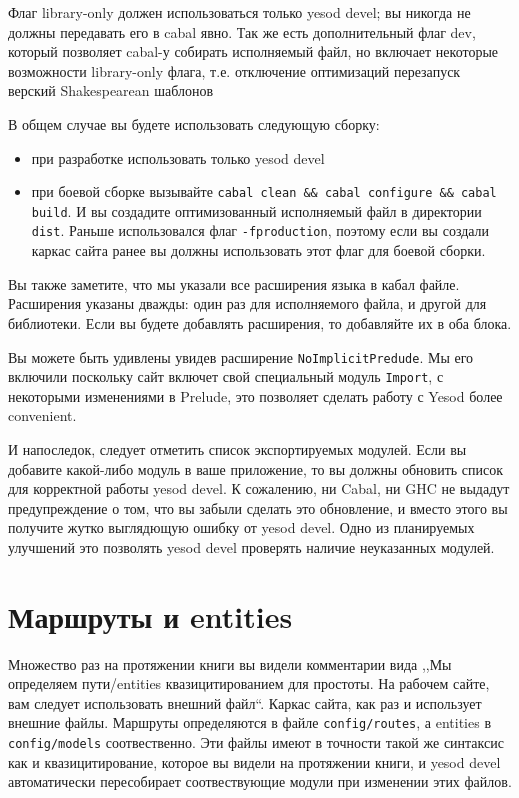 Флаг library-only должен использоваться только yesod devel; вы никогда не должны передавать его в 
cabal явно. Так же есть дополнительный флаг dev, который позволяет cabal-у собирать исполняемый файл,
но включает некоторые возможности library-only флага, т.е. отключение оптимизаций перезапуск
верский Shakespearean шаблонов

В общем случае вы будете использовать следующую сборку:
\begin{itemize}
    \item при разработке использовать только yesod devel
    \item при боевой сборке вызывайте \lstinline!cabal clean && cabal configure && cabal build!. И вы
        создадите оптимизованный исполняемый файл в директории \texttt{dist}. Раньше использовался флаг
        \lstinline!-fproduction!, поэтому если вы создали каркас сайта ранее вы должны использовать этот
        флаг для боевой сборки.
\end{itemize}

Вы также заметите, что мы указали все расширения языка в кабал файле. Расширения указаны дважды:
один раз для исполняемого файла, и другой для библиотеки. Если вы будете добавлять расширения, то
добавляйте их в оба блока.

Вы можете быть удивлены увидев расширение \texttt{NoImplicitPredude}. Мы его включили поскольку сайт 
включет свой специальный модуль \lstinline!Import!, с некоторыми изменениями в Prelude, это позволяет
сделать работу с Yesod более convenient.

И напоследок, следует отметить список экспортируемых модулей. Если вы добавите какой-либо модуль в 
ваше приложение, то вы должны обновить список для корректной работы yesod devel. К сожалению,
ни Cabal, ни GHC не выдадут предупреждение о том, что вы забыли сделать это обновление, и вместо этого
вы получите жутко выглядющую ошибку от yesod devel. Одно из планируемых улучшений это позволять yesod
devel проверять наличие неуказанных модулей.

\section{Маршруты и entities}

Множество раз на протяжении книги вы видели комментарии вида ,,Мы определяем пути/entities квазицитированием для простоты. 
На рабочем сайте, вам следует использовать внешний файл``. Каркас сайта, как раз и использует внешние файлы.
Маршруты определяются в файле \texttt{config/routes}, а entities в \texttt{config/models} соотвественно. Эти файлы
имеют в точности такой же синтаксис как и квазицитирование, которое вы видели на протяжении книги, и yesod devel 
автоматически пересобирает соотвествующие модули при изменении этих файлов.

